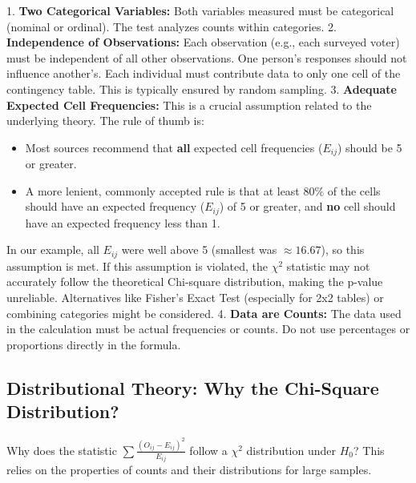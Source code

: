 \documentclass{article}
\begin{document}
1.  \textbf{Two Categorical Variables:} Both variables measured must be categorical (nominal or ordinal). The test analyzes counts within categories.
2.  \textbf{Independence of Observations:} Each observation (e.g., each surveyed voter) must be independent of all other observations. One person's responses should not influence another's. Each individual must contribute data to only one cell of the contingency table. This is typically ensured by random sampling.
3.  \textbf{Adequate Expected Cell Frequencies:} This is a crucial assumption related to the underlying theory. The rule of thumb is:
    \begin{itemize}
        \item Most sources recommend that \textbf{all} expected cell frequencies ($E_{ij}$) should be 5 or greater.
        \item A more lenient, commonly accepted rule is that at least 80\% of the cells should have an expected frequency ($E_{ij}$) of 5 or greater, and \textbf{no} cell should have an expected frequency less than 1.
    \end{itemize}
    In our example, all $E_{ij}$ were well above 5 (smallest was $\approx 16.67$), so this assumption is met. If this assumption is violated, the $\chi^2$ statistic may not accurately follow the theoretical Chi-square distribution, making the p-value unreliable. Alternatives like Fisher's Exact Test (especially for 2x2 tables) or combining categories might be considered.
4.  \textbf{Data are Counts:} The data used in the calculation must be actual frequencies or counts. Do not use percentages or proportions directly in the formula.

\subsection{Distributional Theory: Why the Chi-Square Distribution?}

Why does the statistic $\sum \frac{(O_{ij} - E_{ij})^2}{E_{ij}}$ follow a $\chi^2$ distribution under $H_0$? This relies on the properties of counts and their distributions for large samples.
\end{document}
